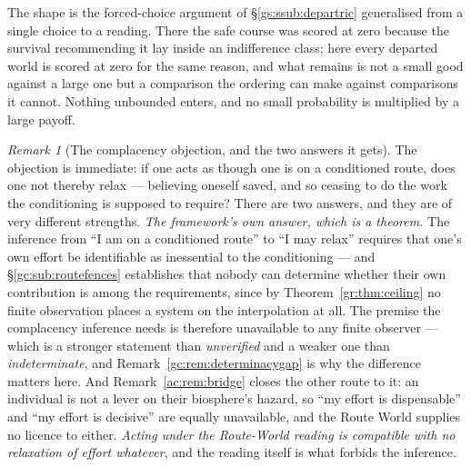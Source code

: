 \documentclass[11pt]{article}
\numberwithin{equation}{section}
\theoremstyle{plain}
\theoremstyle{definition}
\theoremstyle{remark}
\newtheorem{remark}[theorem]{Remark}
\begin{document}
The shape is the forced-choice argument of \S\ref{gs:ssub:departric}
generalised from a single choice to a reading. There the safe course was
scored at zero because the survival recommending it lay inside an
indifference class; here every departed world is scored at zero for the
same reason, and what remains is not a small good against a large one
but a comparison the ordering can make against comparisons it cannot.
Nothing unbounded enters, and no small probability is multiplied by a
large payoff.

\begin{remark}[The complacency objection, and the two answers it
gets]\label{gc:rem:complacency}
The objection is immediate: if one acts as though one is on a
conditioned route, does one not thereby relax --- believing oneself
saved, and so ceasing to do the work the conditioning is supposed to
require? There are two answers, and they are of very different
strengths. \emph{The framework's own answer, which is a theorem.} The inference
from ``I am on a conditioned route'' to ``I may relax'' requires that
one's own effort be identifiable as inessential to the conditioning ---
and \S\ref{gc:sub:routefences} establishes that nobody can determine
whether their own contribution is among the requirements, since by
Theorem~\ref{gr:thm:ceiling} no finite observation places a system on
the interpolation at all. The premise the complacency
inference needs is therefore unavailable to any finite observer --- which
is a stronger statement than \emph{unverified} and a weaker one than
\emph{indeterminate}, and Remark~\ref{gc:rem:determinacygap} is why the
difference matters here. And
Remark~\ref{ac:rem:bridge} closes the other route to it: an individual
is not a lever on their biosphere's hazard, so ``my effort is
dispensable'' and ``my effort is decisive'' are equally unavailable, and
the Route World supplies no licence to either. \emph{Acting under the
Route-World reading is compatible with no relaxation of effort
whatever}, and the reading itself is what forbids the inference.


\end{remark}
\end{document}
